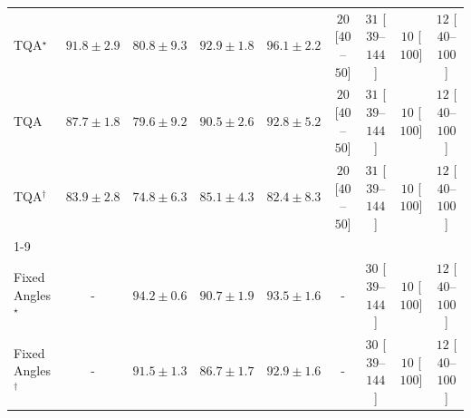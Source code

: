 \begin{tabular}{l|cccc|cccc|}
TQA$^\star$ & {\cellcolor[HTML]{CB4B02}} \color[HTML]{F1F1F1} $91.8\pm 2.9$ & {\cellcolor[HTML]{FEC859}} \color[HTML]{000000} $80.8\pm 9.3$ & {\cellcolor[HTML]{BB4403}} \color[HTML]{F1F1F1} $92.9\pm 1.8$ & {\cellcolor[HTML]{8B3005}} \color[HTML]{F1F1F1} $96.1\pm 2.2$ & {\cellcolor[HTML]{FDE4E1}} \color[HTML]{000000} $20$ [$40$--$50$] & {\cellcolor[HTML]{FDD8D5}} \color[HTML]{000000} $31$ [$39$--$144$] & {\cellcolor[HTML]{FEEEEB}} \color[HTML]{000000} $10$ [$100$] & {\cellcolor[HTML]{FEECE9}} \color[HTML]{000000} $12$ [$40$--$100$] \\
TQA & {\cellcolor[HTML]{EE7617}} \color[HTML]{F1F1F1} $87.7\pm 1.8$ & {\cellcolor[HTML]{FED36F}} \color[HTML]{000000} $79.6\pm 9.2$ & {\cellcolor[HTML]{D75908}} \color[HTML]{F1F1F1} $90.5\pm 2.6$ & {\cellcolor[HTML]{BC4503}} \color[HTML]{F1F1F1} $92.8\pm 5.2$ & {\cellcolor[HTML]{FDE4E1}} \color[HTML]{000000} $20$ [$40$--$50$] & {\cellcolor[HTML]{FDD8D5}} \color[HTML]{000000} $31$ [$39$--$144$] & {\cellcolor[HTML]{FEEEEB}} \color[HTML]{000000} $10$ [$100$] & {\cellcolor[HTML]{FEECE9}} \color[HTML]{000000} $12$ [$40$--$100$] \\
TQA$^\dagger$ & {\cellcolor[HTML]{FEA332}} \color[HTML]{000000} $83.9\pm 2.8$ & {\cellcolor[HTML]{FFF4B6}} \color[HTML]{000000} $74.8\pm 6.3$ & {\cellcolor[HTML]{FC9427}} \color[HTML]{000000} $85.1\pm 4.3$ & {\cellcolor[HTML]{FEB643}} \color[HTML]{000000} $82.4\pm 8.3$ & {\cellcolor[HTML]{FDE4E1}} \color[HTML]{000000} $20$ [$40$--$50$] & {\cellcolor[HTML]{FDD8D5}} \color[HTML]{000000} $31$ [$39$--$144$] & {\cellcolor[HTML]{FEEEEB}} \color[HTML]{000000} $10$ [$100$] & {\cellcolor[HTML]{FEECE9}} \color[HTML]{000000} $12$ [$40$--$100$] \\
\cline{1-9}
\multicolumn{9}{c}{\rule{0pt}{8pt}PP} \\
\midrule
Fixed Angles$^\star$ & {\cellcolor[HTML]{000000}} \color[HTML]{F1F1F1} {\cellcolor{white}} \color{black} - & {\cellcolor[HTML]{0A703A}} \color[HTML]{F1F1F1} $94.2\pm 0.6$ & {\cellcolor[HTML]{2C8F4B}} \color[HTML]{F1F1F1} $90.7\pm 1.9$ & {\cellcolor[HTML]{11753D}} \color[HTML]{F1F1F1} $93.5\pm 1.6$ & {\cellcolor[HTML]{000000}} \color[HTML]{F1F1F1} {\cellcolor{white}} \color{black} - & {\cellcolor[HTML]{FDD9D6}} \color[HTML]{000000} $30$ [$39$--$144$] & {\cellcolor[HTML]{FEEEEB}} \color[HTML]{000000} $10$ [$100$] & {\cellcolor[HTML]{FEECE9}} \color[HTML]{000000} $12$ [$40$--$100$] \\
Fixed Angles$^\dagger$ & {\cellcolor[HTML]{000000}} \color[HTML]{F1F1F1} {\cellcolor{white}} \color{black} - & {\cellcolor[HTML]{258745}} \color[HTML]{F1F1F1} $91.5\pm 1.3$ & {\cellcolor[HTML]{5AB76A}} \color[HTML]{F1F1F1} $86.7\pm 1.7$ & {\cellcolor[HTML]{177B3F}} \color[HTML]{F1F1F1} $92.9\pm 1.6$ & {\cellcolor[HTML]{000000}} \color[HTML]{F1F1F1} {\cellcolor{white}} \color{black} - & {\cellcolor[HTML]{FDD9D6}} \color[HTML]{000000} $30$ [$39$--$144$] & {\cellcolor[HTML]{FEEEEB}} \color[HTML]{000000} $10$ [$100$] & {\cellcolor[HTML]{FEECE9}} \color[HTML]{000000} $12$ [$40$--$100$] \\

\end{tabular}
